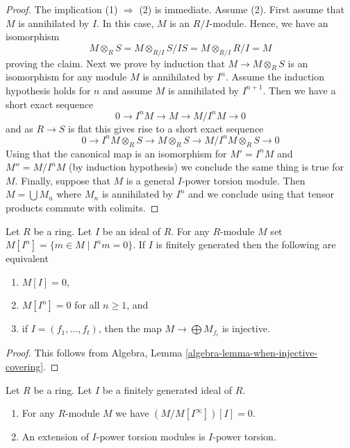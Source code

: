 \begin{proof}
The implication (1) $\Rightarrow$ (2) is immediate.
Assume (2). First assume that $M$ is annihilated by $I$.
In this case, $M$ is an $R/I$-module. Hence, we have an isomorphism
$$
M \otimes_R S = M \otimes_{R/I} S/IS = M \otimes_{R/I} R/I = M
$$
proving the claim. Next we prove by induction that $M \to M \otimes_R S$
is an isomorphism for any module $M$ is annihilated by $I^n$. Assume
the induction hypothesis holds for $n$ and assume $M$ is annihilated by
$I^{n + 1}$. Then we have a short exact sequence
$$
0 \to I^nM \to M \to M/I^nM \to 0
$$
and as $R \to S$ is flat this gives rise to a short exact sequence
$$
0 \to I^nM \otimes_R S \to M \otimes_R S \to M/I^nM \otimes_R S \to 0
$$
Using that the canonical map is an isomorphism for $M' = I^nM$ and
$M'' = M/I^nM$ (by induction hypothesis) we conclude the same thing is
true for $M$. Finally, suppose that $M$ is a general $I$-power torsion
module. Then $M = \bigcup M_n$ where $M_n$ is annihilated by $I^n$
and we conclude using that tensor products commute with colimits.
\end{proof}

\begin{lemma}
\label{lemma-torsion-free}
Let $R$ be a ring. Let $I$ be an ideal of $R$.
For any $R$-module $M$ set $M[I^n] = \{m \in M \mid I^nm = 0\}$.
If $I$ is finitely generated then the following are equivalent
\begin{enumerate}
\item $M[I] = 0$,
\item $M[I^n] = 0$ for all $n \geq 1$, and
\item if $I = (f_1, \ldots, f_t)$, then the map
$M \to \bigoplus M_{f_i}$ is injective.
\end{enumerate}
\end{lemma}

\begin{proof}
This follows from
Algebra, Lemma \ref{algebra-lemma-when-injective-covering}.
\end{proof}

\begin{lemma}
\label{lemma-divide-by-torsion}
Let $R$ be a ring. Let $I$ be a finitely generated ideal of $R$.
\begin{enumerate}
\item For any $R$-module $M$ we have $(M/M[I^\infty])[I] = 0$.
\item An extension of $I$-power torsion modules is $I$-power torsion.
\end{enumerate}
\end{lemma}

